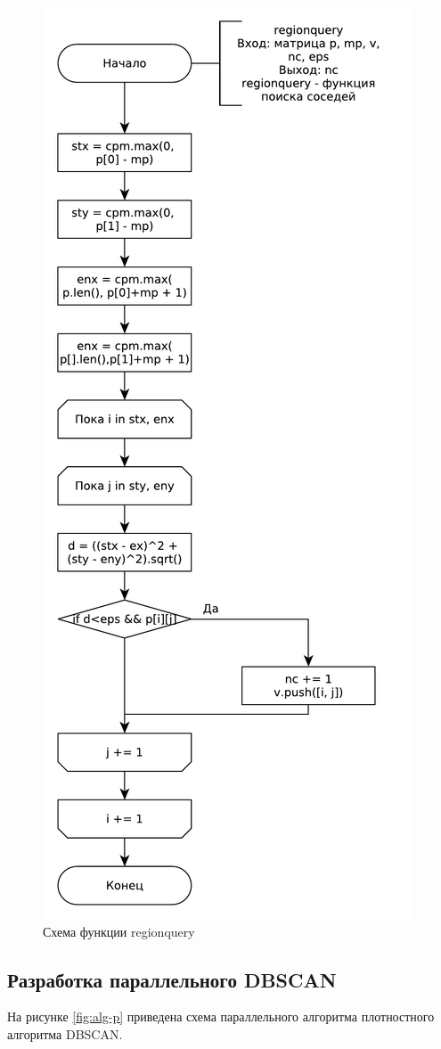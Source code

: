 \begin{figure}[ht!]
	\centering
	\includegraphics[width=0.5\linewidth]{assets/graphs/regionquery.pdf}
	\caption{Схема функции regionquery}
	\label{fig:alg2}
\end{figure}

\subsection{Разработка параллельного DBSCAN}

На рисунке \ref{fig:alg-p} приведена схема параллельного алгоритма плотностного алгоритма DBSCAN. %

